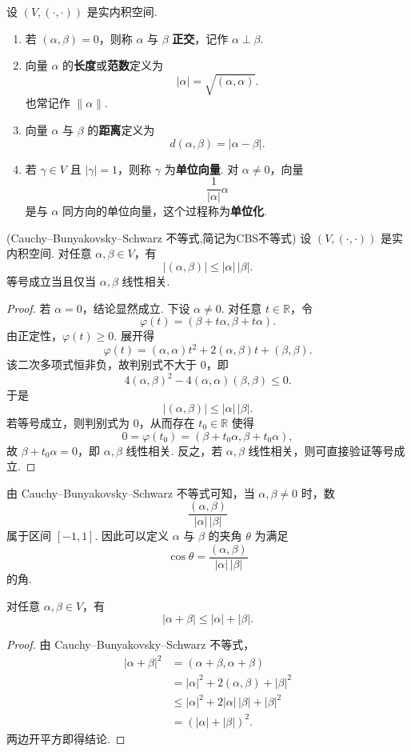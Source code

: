 \begin{definition}\label{p1:concept:c6-l101}
	设 $(V,(\cdot,\cdot))$ 是实内积空间.
	\begin{enumerate}
		\item 若 $(\alpha,\beta)=0$，则称 $\alpha$ 与 $\beta$ \textbf{正交}，记作 $\alpha\perp\beta$.
		\item 向量 $\alpha$ 的\textbf{长度}或\textbf{范数}定义为
		\[
		|\alpha|=\sqrt{(\alpha,\alpha)}.
		\]
		也常记作 $\|\alpha\|$.
		\item 向量 $\alpha$ 与 $\beta$ 的\textbf{距离}定义为
		\[
		d(\alpha,\beta)=|\alpha-\beta|.
		\]
		\item 若 $\gamma\in V$ 且 $|\gamma|=1$，则称 $\gamma$ 为\textbf{单位向量}. 对 $\alpha\ne0$，向量
		\[
		\frac{1}{|\alpha|}\alpha
		\]
		是与 $\alpha$ 同方向的单位向量，这个过程称为\textbf{单位化}.
	\end{enumerate}
\end{definition}

\begin{theorem}(Cauchy--Bunyakovsky--Schwarz 不等式,简记为CBS不等式)
	设 $(V,(\cdot,\cdot))$ 是实内积空间. 对任意 $\alpha,\beta\in V$，有
	\[
	|(\alpha,\beta)|\leqslant |\alpha|\,|\beta|.
	\]
	等号成立当且仅当 $\alpha,\beta$ 线性相关.
\end{theorem}
\begin{proof}
	若 $\alpha=0$，结论显然成立. 下设 $\alpha\ne0$. 对任意 $t\in\mathbb{R}$，令
	\[
	\varphi(t)=(\beta+t\alpha,\beta+t\alpha).
	\]
	由正定性，$\varphi(t)\geqslant0$. 展开得
	\[
	\varphi(t)=(\alpha,\alpha)t^2+2(\alpha,\beta)t+(\beta,\beta).
	\]
	该二次多项式恒非负，故判别式不大于 $0$，即
	\[
	4(\alpha,\beta)^2-4(\alpha,\alpha)(\beta,\beta)\leqslant0.
	\]
	于是
	\[
	|(\alpha,\beta)|\leqslant |\alpha|\,|\beta|.
	\]
	若等号成立，则判别式为 $0$，从而存在 $t_0\in\mathbb{R}$ 使得
	\[
	0=\varphi(t_0)=(\beta+t_0\alpha,\beta+t_0\alpha),
	\]
	故 $\beta+t_0\alpha=0$，即 $\alpha,\beta$ 线性相关. 反之，若 $\alpha,\beta$ 线性相关，则可直接验证等号成立.
\end{proof}

由 Cauchy--Bunyakovsky--Schwarz 不等式可知，当 $\alpha,\beta\ne0$ 时，数
\[
\frac{(\alpha,\beta)}{|\alpha|\,|\beta|}
\]
\label{p1:concept:c6-l157}属于区间 $[-1,1]$. 因此可以定义 $\alpha$ 与 $\beta$ 的夹角 $\theta$ 为满足
\[
\cos\theta=\frac{(\alpha,\beta)}{|\alpha|\,|\beta|}
\]
的角.

\begin{corollary}[三角不等式]
	对任意 $\alpha,\beta\in V$，有
	\[
	|\alpha+\beta|\leqslant |\alpha|+|\beta|.
	\]
\end{corollary}
\begin{proof}
	由 Cauchy--Bunyakovsky--Schwarz 不等式，
	\[
	\begin{aligned}
		|\alpha+\beta|^2
		&=(\alpha+\beta,\alpha+\beta)\\
		&=|\alpha|^2+2(\alpha,\beta)+|\beta|^2\\
		&\leqslant |\alpha|^2+2|\alpha|\,|\beta|+|\beta|^2\\
		&=(|\alpha|+|\beta|)^2.
	\end{aligned}
	\]
	两边开平方即得结论.
\end{proof}

